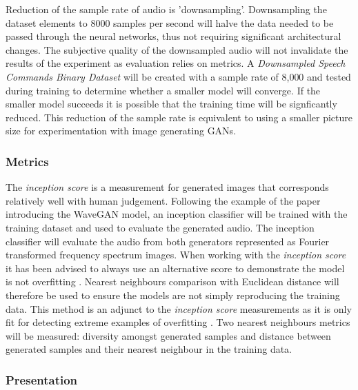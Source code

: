 \documentclass[a4paper, dvipsnames, titlepage]{article}
\begin{document}
\newline
\newline
Reduction of the sample rate of audio is 'downsampling'.
Downsampling the dataset elements to 8000 samples per second will halve the data needed to be passed through the neural networks, thus not requiring significant architectural changes.
The subjective quality of the downsampled audio will not invalidate the results of the experiment as evaluation relies on metrics.
\newline
\newline
A \textit{Downsampled Speech Commands Binary Dataset} will be created with a sample rate of 8,000 and tested during training to determine whether a smaller model will converge.
If the smaller model succeeds it is possible that the training time will be signficantly reduced.
This reduction of the sample rate is equivalent to using a smaller picture size for experimentation with image generating GANs.

\subsubsection{Metrics}

The \textit{inception score} is a measurement for generated images that corresponds relatively well with human judgement.
Following the example of the paper introducing the WaveGAN model, an inception classifier will be trained with the training dataset and used to evaluate the generated audio.
The inception classifier will evaluate the audio from both generators represented as Fourier transformed frequency spectrum images.
\newline
\newline
When working with the \textit{inception score} it has been advised to always use an alternative score to demonstrate the model is not overfitting \citep{2018arXiv180101973B}.
Nearest neighbours comparison with Euclidean distance will therefore be used to ensure the models are not simply reproducing the training data.
This method is an adjunct to the \textit{inception score} measurements as it is only fit for detecting extreme examples of overfitting \citep{2015arXiv151101844T}.
Two nearest neighbours metrics will be measured: diversity amongst generated samples and distance between generated samples and their nearest neighbour in the training data.

\subsubsection{Presentation}
\end{document}
